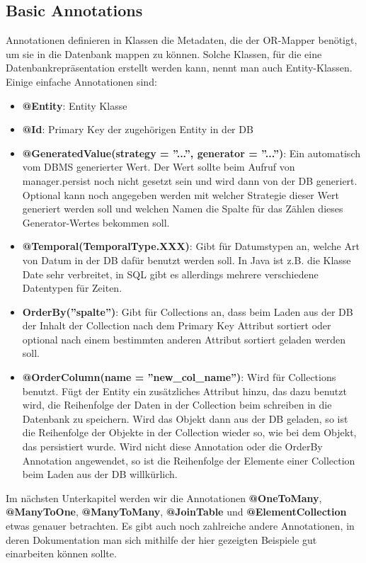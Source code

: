 \subsection{Basic Annotations}
Annotationen definieren in Klassen die Metadaten, die der OR-Mapper benötigt, um sie in die Datenbank mappen zu können. Solche Klassen, für die eine Datenbankrepräsentation erstellt werden kann, nennt man auch Entity-Klassen.\\
Einige einfache Annotationen sind:
\begin{itemize}
    \item \textbf{@Entity}: Entity Klasse
    \item \textbf{@Id}: Primary Key der zugehörigen Entity in der DB
    \item \textbf{@GeneratedValue(strategy = ''...'', generator = ''...'')}: Ein automatisch vom DBMS generierter Wert. Der Wert sollte beim Aufruf von manager.persist noch nicht gesetzt sein und wird dann von der DB generiert. Optional kann noch angegeben werden mit welcher Strategie dieser Wert generiert werden soll und welchen Namen die Spalte für das Zählen dieses Generator-Wertes bekommen soll.
    \item \textbf{@Temporal(TemporalType.XXX)}: Gibt für Datumstypen an, welche Art von Datum in der DB dafür benutzt werden soll. In Java ist z.B. die Klasse Date sehr verbreitet, in SQL gibt es allerdings mehrere verschiedene Datentypen für Zeiten.
    \item \textbf{OrderBy(''spalte'')}: Gibt für Collections an, dass beim Laden aus der DB der Inhalt der Collection nach dem Primary Key Attribut sortiert oder optional nach einem bestimmten anderen Attribut sortiert geladen werden soll.
    \item \textbf{@OrderColumn(name = ''new\_col\_name'')}: Wird für Collections benutzt. Fügt der Entity ein zusätzliches Attribut hinzu, das dazu benutzt wird, die Reihenfolge der Daten in der Collection beim schreiben in die Datenbank zu speichern. Wird das Objekt dann aus der DB geladen, so ist die Reihenfolge der Objekte in der Collection wieder so, wie bei dem Objekt, das persistiert wurde. Wird nicht diese Annotation oder die OrderBy Annotation angewendet, so ist die Reihenfolge der Elemente einer Collection beim Laden aus der DB willkürlich.
\end{itemize}
Im nächsten Unterkapitel werden wir die Annotationen \textbf{@OneToMany}, \textbf{@ManyToOne}, \textbf{@ManyToMany}, \textbf{@JoinTable} und \textbf{@ElementCollection} etwas genauer betrachten. Es gibt auch noch zahlreiche andere Annotationen, in deren Dokumentation man sich mithilfe der hier gezeigten Beispiele gut einarbeiten können sollte.

